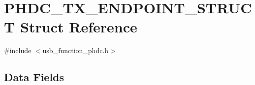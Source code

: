 \hypertarget{struct_p_h_d_c___t_x___e_n_d_p_o_i_n_t___s_t_r_u_c_t}{}\section{P\+H\+D\+C\+\_\+\+T\+X\+\_\+\+E\+N\+D\+P\+O\+I\+N\+T\+\_\+\+S\+T\+R\+U\+C\+T Struct Reference}
\label{struct_p_h_d_c___t_x___e_n_d_p_o_i_n_t___s_t_r_u_c_t}


{\ttfamily \#include $<$usb\+\_\+function\+\_\+phdc.\+h$>$}

\subsection*{Data Fields}
